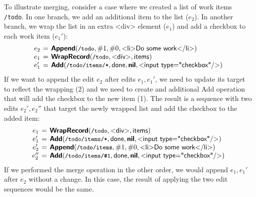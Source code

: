 \documentclass[sigconf]{acmart}
\newcommand{\note}[1]{}
\newcommand{\ident}[1]{{\sffamily #1}}
\newcommand{\srcid}[1]{\textnormal{\sffamily #1}}
\newcommand{\srckvd}[1]{\textnormal{\sffamily\bfseries #1}}
\begin{document}
%


To illustrate merging, consider a case where we created a list of work items {\small\texttt{/todo}}.
In one branch, we add an additional item to the list ($e_2$). In another branch, we wrap the
list in an extra \ident{<div>} element ($e_1$) and add a checkbox to each work item ($e_1'$):
%
\begin{equation*}
\arraycolsep=2pt
\begin{array}{rcl}
e_2 &=& \srckvd{Append}(\textnormal{\small\texttt{/todo}}, \#1, \#0, \srcid{<li>Do some work</li>})\\
e_1 &=& \srckvd{WrapRecord}(\textnormal{\small\texttt{/todo}}, \srcid{<div>}, \srcid{items})\\
e_1' &=& \srckvd{Add}(\textnormal{\small\texttt{/todo/items/*}}, \srcid{done}, \srckvd{nil}, \srcid{<input type="checkbox"/>})\\
\end{array}
\end{equation*}
%
If we want to append the edit $e_2$ after edits $e_1, e_1'$, we need to update its target to
reflect the wrapping (2) and we need to create and additional \ident{Add} operation
that will add the checkbox to the new item (1). The result is a sequence with two edits $e_2', e_2''$
that target the newly wrapped list and add the checkbox to the added item:
%
\begin{equation*}
\arraycolsep=2pt
\begin{array}{rcl}
  e_1 &=& \srckvd{WrapRecord}(\textnormal{\small\texttt{/todo}}, \srcid{<div>}, \srcid{items})\\
  e_1' &=& \srckvd{Add}(\textnormal{\small\texttt{/todo/items/*}}, \srcid{done}, \srckvd{nil}, \srcid{<input type="checkbox"/>})\\
e_2'  &=& \srckvd{Append}(\textnormal{\small\texttt{/todo/items}}, \#1, \#0, \srcid{<li>Do some work</li>})\\
e_2'' &=& \srckvd{Add}(\textnormal{\small\texttt{/todo/items/\#1}}, \srcid{done}, \srckvd{nil}, \srcid{<input type="checkbox"/>})\\
\end{array}
\end{equation*}
%
If we performed the merge operation in the other order, we would append $e_1, e_1'$ after
$e_2$ without a change. In this case, the result of applying the two edit sequences would be the
same.
\end{document}
